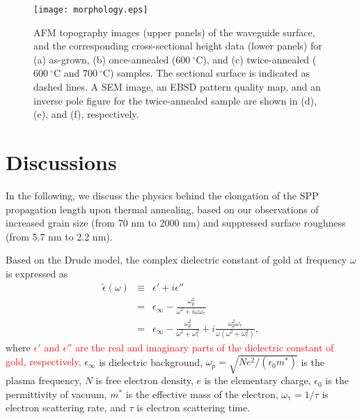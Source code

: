 \documentclass[aip,apl,reprint]{revtex4-1}
\begin{document}
  \begin{figure}
    \texttt{[image: morphology.eps]}
        \caption{AFM topography images (upper panels) of the waveguide surface, and the corresponding cross-sectional height data (lower panels) for (a) as-grown, (b) once-annealed ($600\:^\circ\mathrm{C}$), and (c) twice-annealed ($600\:^\circ\mathrm{C}$ and $700\:^\circ\mathrm{C}$) samples. The sectional surface is indicated as dashed lines. A SEM image, an EBSD pattern quality map, and an inverse pole figure for the twice-annealed sample are shown in (d), (e), and (f), respectively.}
    \label{fig:morphology}
\end{figure}

\section{Discussions}
\label{sec:discussion}
In the following, we discuss the physics behind the elongation of the SPP propagation length upon thermal annealing, based on our observations of increased grain size (from 70 nm to 2000 nm) and suppressed surface roughness (from 5.7 nm to 2.2 nm). 

\color{red}Based on the Drude model, the complex dielectric constant of gold at frequency $\omega$ is expressed as
\begin{eqnarray}
\tilde{\epsilon}(\omega) &\equiv& \epsilon' + i \epsilon'' \nonumber \\
&=& \epsilon_{\infty} - \frac{\omega_p^2}{\omega^2+i\omega \omega_{\mathrm{\tau}}} \nonumber \\
&=& \epsilon_{\infty} - \frac{\omega_p^2}{\omega^2+ \omega_{\mathrm{\tau}}^2} + i \frac{\omega_p^2 \omega_{\mathrm{\tau}}}{\omega (\omega^2 + \omega_{\mathrm{\tau}}^2)},
\label{eq:permittivity}
\end{eqnarray}
where \textcolor{red}{$\epsilon'$ and $\epsilon''$ are the real and imaginary parts of the dielectric constant of gold, respectively,} $\epsilon_{\infty}$ is dielectric background,  $\omega_p=\sqrt{Ne^2/ (\epsilon_0 m^*)}$ is the plasma frequency, $N$ is free electron density, $e$ is the elementary charge, $\epsilon_0$ is the permittivity of vacuum, $m^*$ is the effective mass of the electron, $\omega_{\mathrm{\tau}}=1/\tau$ is electron scattering rate, and $\tau$ is electron scattering time. 
\end{document}
